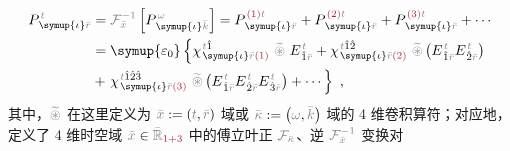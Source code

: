 \begin{subequations}
	\abovedisplayskip=10pt
	\belowdisplayskip=12pt
\begin{align}
	P^{\;\!\mathcolor{gray}{t}}_{\;\! \symup{\iota}\mathcolor{gray}{\bar{r}}} &= \mathcolor{gray}{\mathcal F_{\bar{x}}^{-1}} \left[ P^{\;\! \mathcolor{gray}{\omega}}_{\;\! \symup{\iota}\mathcolor{gray}{\bar{k}}} \right] = P^{\;\! \textcolor{Maroon}{(1)} \mathcolor{gray}{t}}_{\;\! \symup{\iota}\mathcolor{gray}{\bar{r}}} + P^{\;\! \textcolor{Maroon}{(2)} \mathcolor{gray}{t}}_{\;\! \symup{\iota}\mathcolor{gray}{\bar{r}}} + P^{\;\! \textcolor{Maroon}{(3)} \mathcolor{gray}{t}}_{\;\! \symup{\iota}\mathcolor{gray}{\bar{r}}} + \cdots \\ &= {\symup{\varepsilon_0}} \left\{ \chi^{\;\! \mathcolor{gray}{t} \hat{1}}_{\;\! \symup{\iota} \mathcolor{gray}{\bar{r}} \textcolor{Maroon}{(1)}} ~\mathcolor{gray}{\widetilde \circledast}~ E^{\;\!\mathcolor{gray}{t}}_{\;\! \hat{1} \mathcolor{gray}{\bar{r}}} + \chi^{\;\! \mathcolor{gray}{t} \hat{1} \hat{2}}_{\;\! \symup{\iota} \mathcolor{gray}{\bar{r}} \textcolor{Maroon}{(2)}}~\mathcolor{gray}{\widetilde \circledast}\left( E^{\;\!\mathcolor{gray}{t}}_{\;\! \hat{1} \mathcolor{gray}{\bar{r}}} E^{\;\!\mathcolor{gray}{t}}_{\;\! \hat{2} \mathcolor{gray}{\bar{r}}} \right) \right. \label{eq:P_tr} \\ &+ \left. \chi^{\;\! \mathcolor{gray}{t} \hat{1} \hat{2} \hat{3}}_{\;\! \symup{\iota} \mathcolor{gray}{\bar{r}} \textcolor{Maroon}{(3)}}~\mathcolor{gray}{\widetilde \circledast}\left( E^{\;\!\mathcolor{gray}{t}}_{\;\! \hat{1} \mathcolor{gray}{\bar{r}}} E^{\;\!\mathcolor{gray}{t}}_{\;\! \hat{2} \mathcolor{gray}{\bar{r}}} E^{\;\!\mathcolor{gray}{t}}_{\;\! \hat{3} \mathcolor{gray}{\bar{r}}} \right) + \cdots \right\}~,
\end{align}
\end{subequations}
其中，$\mathcolor{gray}{\widetilde \circledast}$ 在这里定义为 $\mathcolor{gray}{\bar{x}} := \left( \mathcolor{gray}{t}, \mathcolor{gray}{\bar{r}} \right)$ 域或 $\mathcolor{gray}{\bar{\kappa}} := \left( \mathcolor{gray}{\omega}, \mathcolor{gray}{\bar{k}} \right)$ 域的 4 维卷积算符；对应地，定义了 4 维时空域 $\mathcolor{gray}{\bar{x}} \in \mathcolor{gray}{\bar{\mathbb{R}}_{\textcolor{Maroon}{1+3}}}$ 中的傅立叶正 $\mathcolor{gray}{\mathcal F_{\bar{\kappa}}}$、逆 $\mathcolor{gray}{\mathcal F_{\bar{x}}^{-1}}$ 变换对
